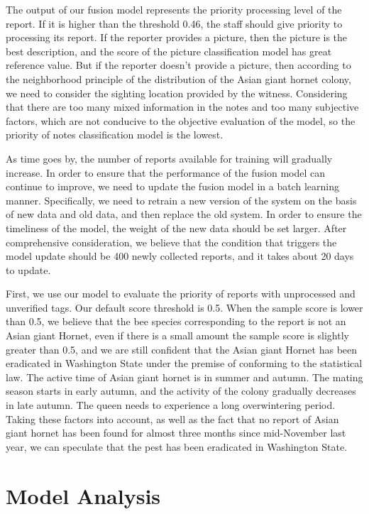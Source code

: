 \documentclass{mcmthesis}
\numberwithin{figure}{section}
\numberwithin{table}{section}
\begin{document}
The output of our fusion model represents the priority processing level of the report. If it is higher than the threshold 0.46, the staff should give priority to processing its report. If the reporter provides a picture, then the picture is the best description, and the score of the picture classification model has great reference value. But if the reporter doesn't provide a picture, then according to the neighborhood principle of the distribution of the Asian giant hornet colony, we need to consider the sighting location provided by the witness. Considering that there are too many mixed information in the notes and too many subjective factors, which are not conducive to the objective evaluation of the model, so the priority of notes classification model is the lowest.

As time goes by, the number of reports available for training will gradually increase. In order to ensure that the performance of the fusion model can continue to improve, we need to update the fusion model in a batch learning manner. Specifically, we need to retrain a new version of the system on the basis of new data and old data, and then replace the old system. In order to ensure the timeliness of the model, the weight of the new data should be set larger. After comprehensive consideration, we believe that the condition that triggers the model update should be 400 newly collected reports, and it takes about 20 days to update.

First, we use our model to evaluate the priority of reports with unprocessed and unverified tags. Our default score threshold is 0.5. When the sample score is lower than 0.5, we believe that the bee species corresponding to the report is not an Asian giant Hornet, even if there is a small amount the sample score is slightly greater than 0.5, and we are still confident that the Asian giant Hornet has been eradicated in Washington State under the premise of conforming to the statistical law. The active time of Asian giant hornet is in summer and autumn. The mating season starts in early autumn, and the activity of the colony gradually decreases in late autumn. The queen needs to experience a long overwintering period. Taking these factors into account, as well as the fact that no report of Asian giant hornet has been found for almost three months since mid-November last year, we can speculate that the pest has been eradicated in Washington State.

\section{Model Analysis}
\end{document}
